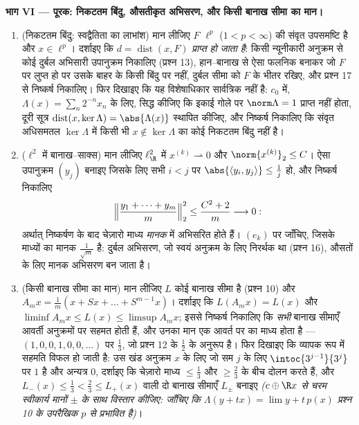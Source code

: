 \begin{problem}[{सप्ताहांत समस्या --- $(\ell^p)' = \ell^q$, स्वद्वैतिता, और
$\ell^\infty$ की विचित्रता}]
\medskip
\noindent\textbf{भाग VI --- पूरक: निकटतम बिंदु, औसतीकृत अभिसरण,
और किसी बानाख सीमा का मान।}
\begin{enumerate}[resume]
  \item (निकटतम बिंदु: स्वद्वैतिता का लाभांश) मान लीजिए $F$
        $\ell^p$ ($1 < p < \infty$) की संवृत उपसमष्टि है और $x \in \ell^p$। दर्शाइए कि
        $d = \operatorname{dist}(x,
        F)$ \emph{प्राप्त हो जाता है}: किसी न्यूनीकारी अनुक्रम
        से कोई दुर्बल अभिसारी उपानुक्रम निकालिए (प्रश्न 13),
        हान--बानाख से ऐसा फलनिक बनाकर जो $F$ पर लुप्त हो पर
        उसके बाहर के किसी बिंदु पर नहीं, दुर्बल सीमा को $F$ के
        भीतर रखिए, और प्रश्न 17 से निष्कर्ष निकालिए। फिर दिखाइए
        कि यह विशेषाधिकार सार्वत्रिक नहीं है: $c_0$ में, $\Lambda(x) = \sum_n2^{-n}x_n$ के
        लिए, सिद्ध कीजिए कि इकाई गोले पर $\norm\Lambda = 1$ प्राप्त नहीं होता,
        दूरी सूत्र $\operatorname{dist}(x, \ker\Lambda) =
        \abs{\Lambda(x)}$ स्थापित कीजिए, और निष्कर्ष निकालिए कि
        संवृत अधिसमतल $\ker\Lambda$ में किसी भी $x \notin
        \ker\Lambda$ का कोई निकटतम बिंदु
        नहीं है।
  \item ($\ell^2$ में बानाख--साक्स) मान लीजिए $\ell^2_{\R}$ में $x^{(k)}
        \rightharpoonup 0$ और
        $\norm{x^{(k)}}_2 \leq C$। ऐसा उपानुक्रम $(y_j)$ बनाइए जिसके लिए सभी $i < j$ पर
        $\abs{\langle y_i, y_j\rangle} \leq
        \frac1j$ हो, और निष्कर्ष निकालिए
        \[
        \Bigl\lVert\frac{y_1 + \dots + y_m}m\Bigr\rVert_2^2
        \leq \frac{C^2 + 2}m \longrightarrow 0 :
        \]
        अर्थात् निष्कर्षण के बाद चेज़ारो माध्य \emph{मानक} में
        अभिसरित होते हैं। $(e_k)$ पर जाँचिए, जिसके माध्यों का मानक
        $\frac1{\sqrt m}$ है: दुर्बल अभिसरण, जो स्वयं अनुक्रम के लिए निरर्थक
        था (प्रश्न 16), औसतों के लिए मानक अभिसरण बन जाता है।
  \item (किसी बानाख सीमा का मान) मान लीजिए $L$ कोई बानाख सीमा
        है (प्रश्न 10) और $A_mx = \frac1m(x + Sx + \dots
        + S^{m-1}x)$। दर्शाइए कि $L(A_mx) = L(x)$ और $\liminf A_mx
        \leq L(x) \leq \limsup A_mx$; इससे
        निष्कर्ष निकालिए कि \emph{सभी} बानाख सीमाएँ आवर्ती
        अनुक्रमों पर सहमत होती हैं, और उनका मान एक आवर्त पर का
        माध्य होता है --- $(1, 0, 0, 1,
        0, 0, \dots)$ पर $\frac13$, जो प्रश्न 12 के $\frac12$
        के अनुरूप है। फिर दिखाइए कि व्यापक रूप में सहमति विफल हो
        जाती है: उस खंड अनुक्रम $x$ के लिए जो सम $j$ के लिए
        $\intoc{3^{j-1}}{3^j}$ पर $1$ है और अन्यत्र $0$, दर्शाइए कि चेज़ारो
        माध्य $\leq
        \frac13$ और $\geq \frac23$ के बीच दोलन करते हैं, और $L_-(x) \leq \frac13 < \frac23
        \leq L_+(x)$ वाली
        दो बानाख सीमाएँ $L_\pm$ बनाइए \emph{($c \oplus \R x$ से चरम स्वीकार्य
        मानों $\pm$ के साथ विस्तार कीजिए: जाँचिए कि $\Lambda(y + tx) = \lim y + t\,p(x)$ प्रश्न
        10 के उपरैखिक $p$ से प्रभावित है)}।
\end{enumerate}
\end{problem}
